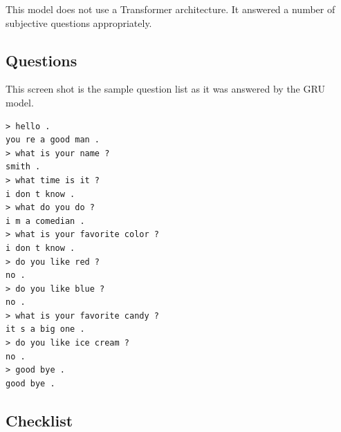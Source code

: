 This model does not use a Transformer architecture. %
It answered a number of subjective questions appropriately. %

\label{chatbot-gru-tutorial-used}

\subsection{Questions}
This screen shot is the sample question list as it was answered by the GRU model.

\begin{verbatim}
> hello .
you re a good man .
> what is your name ?
smith .
> what time is it ?
i don t know .
> what do you do ?
i m a comedian .
> what is your favorite color ?
i don t know .
> do you like red ?
no .
> do you like blue ?
no .
> what is your favorite candy ?
it s a big one .
> do you like ice cream ?
no .
> good bye .
good bye .
\end{verbatim}


\subsection{Checklist}

